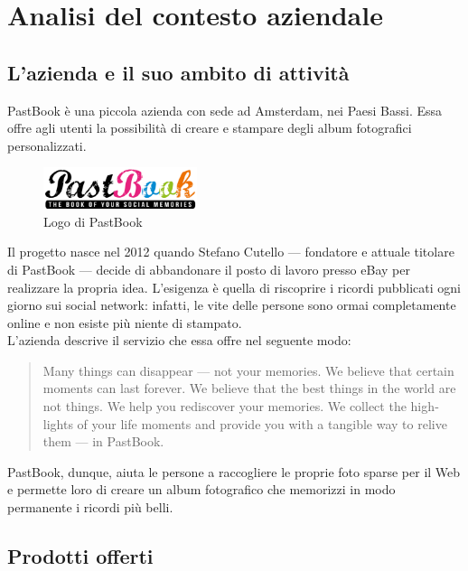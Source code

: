 \chapter{Analisi del contesto aziendale}
	\section{L'azienda e il suo ambito di attività}
		PastBook è una piccola azienda con sede ad Amsterdam, nei Paesi Bassi. Essa offre agli utenti la possibilità di creare e stampare
		degli album fotografici personalizzati.
		\begin{figure}[H]
			\centering
			\includegraphics[width=0.4\textwidth]{capitolo_1/immagini/logo_pastbook.png}
			\caption[Logo di PastBook]{Logo di PastBook\protect\footnotemark}
		\end{figure}
		\noindent Il progetto nasce nel 2012 quando Stefano Cutello — fondatore e attuale titolare di PastBook — decide di abbandonare il
		posto di lavoro presso eBay per realizzare la propria idea. L'esigenza è quella di riscoprire i
		ricordi pubblicati ogni giorno sui social network: infatti, le vite delle persone sono ormai completamente online e non esiste più
		niente di stampato.\\
		L'azienda descrive il servizio che essa offre nel seguente modo:
		\hyphenblockquote{english}{Many things can disappear — not your memories. We believe that certain moments can last forever. We
			believe that the best things in the world are not things. We help you rediscover your memories. We collect the highlights of
			your life moments and provide you with a tangible way to relive them — in PastBook.}
		PastBook, dunque, aiuta le persone a raccogliere le proprie foto sparse per il Web e permette loro di creare un album fotografico
		che memorizzi in modo permanente i ricordi più belli.
	\section{Prodotti offerti}
